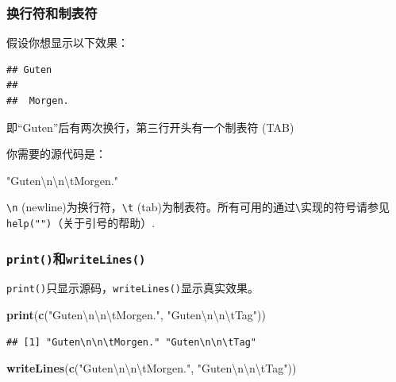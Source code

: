 \documentclass[]{book}
\newenvironment{Shaded}{\begin{snugshade}}{\end{snugshade}}
\newcommand{\CharTok}[1]{\textcolor[rgb]{0.31,0.60,0.02}{#1}}
\newcommand{\KeywordTok}[1]{\textcolor[rgb]{0.13,0.29,0.53}{\textbf{#1}}}
\newcommand{\NormalTok}[1]{#1}
\newcommand{\StringTok}[1]{\textcolor[rgb]{0.31,0.60,0.02}{#1}}
\begin{document}
\subsubsection{换行符和制表符}

假设你想显示以下效果：

\begin{verbatim}
## Guten
## 
##  Morgen.
\end{verbatim}

即``Guten''后有两次换行，第三行开头有一个制表符 (TAB)

你需要的源代码是：

\begin{Shaded}
\begin{Highlighting}[]
\StringTok{"Guten}\CharTok{\textbackslash{}n\textbackslash{}n\textbackslash{}t}\StringTok{Morgen."}
\end{Highlighting}
\end{Shaded}

\texttt{\textbackslash{}n} (newline)为换行符，\texttt{\textbackslash{}t} (tab)为制表符。所有可用的通过\texttt{\textbackslash{}}实现的符号请参见\texttt{help("\textquotesingle{}")}（关于引号的帮助）.

\hypertarget{printwritelines}{%
\subsubsection{\texorpdfstring{\texttt{print()}和\texttt{writeLines()}}{print()和writeLines()}}\label{printwritelines}}

\texttt{print()}只显示源码，\texttt{writeLines()}显示真实效果。

\begin{Shaded}
\begin{Highlighting}[]
\KeywordTok{print}\NormalTok{(}\KeywordTok{c}\NormalTok{(}\StringTok{"Guten}\CharTok{\textbackslash{}n\textbackslash{}n\textbackslash{}t}\StringTok{Morgen."}\NormalTok{, }\StringTok{"Guten}\CharTok{\textbackslash{}n\textbackslash{}n\textbackslash{}t}\StringTok{Tag"}\NormalTok{))}
\end{Highlighting}
\end{Shaded}

\begin{verbatim}
## [1] "Guten\n\n\tMorgen." "Guten\n\n\tTag"
\end{verbatim}

\begin{Shaded}
\begin{Highlighting}[]
\KeywordTok{writeLines}\NormalTok{(}\KeywordTok{c}\NormalTok{(}\StringTok{"Guten}\CharTok{\textbackslash{}n\textbackslash{}n\textbackslash{}t}\StringTok{Morgen."}\NormalTok{, }\StringTok{"Guten}\CharTok{\textbackslash{}n\textbackslash{}n\textbackslash{}t}\StringTok{Tag"}\NormalTok{))}
\end{Highlighting}
\end{Shaded}
\end{document}
